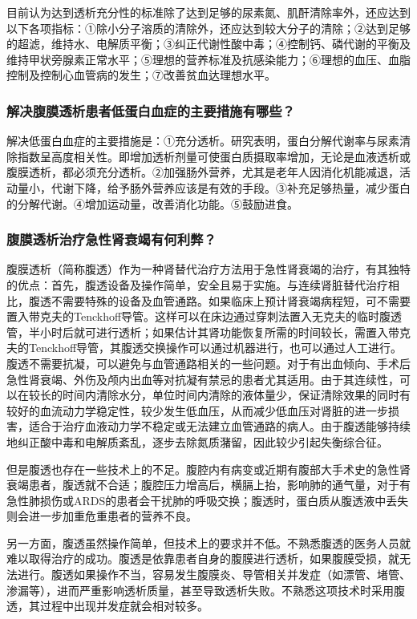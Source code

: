 目前认为达到透析充分性的标准除了达到足够的尿素氮、肌酐清除率外，还应达到以下各项指标：①除小分子溶质的清除外，还应达到较大分子的清除；②达到足够的超滤，维持水、电解质平衡；③纠正代谢性酸中毒；④控制钙、磷代谢的平衡及维持甲状旁腺素正常水平；⑤理想的营养标准及抗感染能力；⑥理想的血压、血脂控制及控制心血管病的发生；⑦改善贫血达理想水平。

\subsubsection{解决腹膜透析患者低蛋白血症的主要措施有哪些？}

解决低蛋白血症的主要措施是：①充分透析。研究表明，蛋白分解代谢率与尿素清除指数呈高度相关性。即增加透析剂量可使蛋白质摄取率增加，无论是血液透析或腹膜透析，都必须充分透析。②加强肠外营养，尤其是老年人因消化机能减退，活动量小，代谢下降，给予肠外营养应该是有效的手段。③补充足够热量，减少蛋白的分解代谢。④增加运动量，改善消化功能。⑤鼓励进食。

\subsubsection{腹膜透析治疗急性肾衰竭有何利弊？}

腹膜透析（简称腹透）作为一种肾替代治疗方法用于急性肾衰竭的治疗，有其独特的优点：首先，腹透设备及操作简单，安全且易于实施。与连续肾脏替代治疗相比，腹透不需要特殊的设备及血管通路。如果临床上预计肾衰竭病程短，可不需要置入带克夫的Tenckhoff导管。这样可以在床边通过穿刺法置入无克夫的临时腹透管，半小时后就可进行透析；如果估计其肾功能恢复所需的时间较长，需置入带克夫的Tenckhoff导管，其腹透交换操作可以通过机器进行，也可以通过人工进行。腹透不需要抗凝，可以避免与血管通路相关的一些问题。对于有出血倾向、手术后急性肾衰竭、外伤及颅内出血等对抗凝有禁忌的患者尤其适用。由于其连续性，可以在较长的时间内清除水分，单位时间内清除的液体量少，保证清除效果的同时有较好的血流动力学稳定性，较少发生低血压，从而减少低血压对肾脏的进一步损害，适合于治疗血液动力学不稳定或无法建立血管通路的病人。由于腹透能够持续地纠正酸中毒和电解质紊乱，逐步去除氮质潴留，因此较少引起失衡综合征。

但是腹透也存在一些技术上的不足。腹腔内有病变或近期有腹部大手术史的急性肾衰竭患者，腹透就不合适；腹腔压力增高后，横膈上抬，影响肺的通气量，对于有急性肺损伤或ARDS的患者会干扰肺的呼吸交换；腹透时，蛋白质从腹透液中丢失则会进一步加重危重患者的营养不良。

另一方面，腹透虽然操作简单，但技术上的要求并不低。不熟悉腹透的医务人员就难以取得治疗的成功。腹透是依靠患者自身的腹膜进行透析，如果腹膜受损，就无法进行。腹透如果操作不当，容易发生腹膜炎、导管相关并发症（如漂管、堵管、渗漏等），进而严重影响透析质量，甚至导致透析失败。不熟悉这项技术时采用腹透，其过程中出现并发症就会相对较多。

